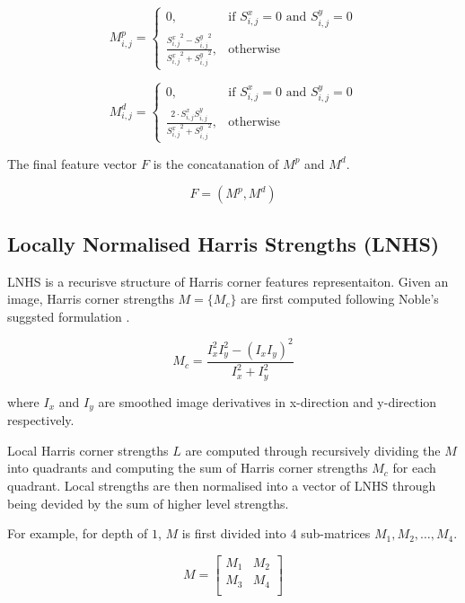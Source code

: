 \begin{equation}
M^p_{i,j} = 
\begin{cases}
    0
    	,& \text{if } {S^x_{i,j}} =0 \text{ and } {S^y_{i,j}} =0\\
    \frac{{S^x_{i,j}}^2 - {S^y_{i,j}}^2}{{S^x_{i,j}}^2 + {S^y_{i,j}}^2}
    	,& \text{otherwise}
\end{cases}
\end{equation}

\begin{equation}
M^d_{i,j} = 
\begin{cases}
    0
    	,& \text{if } {S^x_{i,j}} =0 \text{ and } {S^y_{i,j}} =0\\
    \frac{2 \cdot {S^x_{i,j}}  {S^y_{i,j}}}{{S^x_{i,j}}^2 + {S^y_{i,j}}^2}
    	,& \text{otherwise}
\end{cases}
\end{equation}

The final feature vector $F$ is the concatanation of $M^p$ and $M^d$.

\begin{equation}
F = (M^p, M^d)
\end{equation}

\subsection{Locally Normalised Harris Strengths (LNHS)}
LNHS is a recurisve structure of Harris corner \citep{harris1988combined} features representaiton.
Given an image, Harris corner strengths $M = \{M_c\}$ are first computed following Noble's suggsted formulation \citep{noble1989descriptions}.

\begin{equation}
M_c = \frac{I_x^2 I_y^2 - (I_x I_y)^2}{I_x^2 + I_y^2}
\end{equation}

where $I_x$ and $I_y$ are smoothed image derivatives in x-direction and y-direction respectively.

Local Harris corner strengths $L$ are computed through recursively dividing the $M$ into quadrants and computing the sum of Harris corner strengths $M_c$ for each quadrant.
Local strengths are then normalised into a vector of LNHS through being devided by the sum of higher level strengths.

For example, for depth of $1$, $M$ is first divided into $4$ sub-matrices $M_{1}, M_{2}, \dots, M_{4}$.

\begin{equation}
M = 
\begin{bmatrix}
  M_{1}&  M_{2}\\
  M_{3}&  M_{4}\\
\end{bmatrix}
\end{equation}

